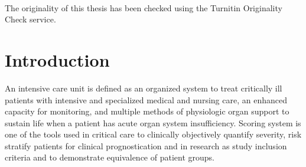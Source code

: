\documentclass[12pt,a4paper,english
]{tunithesis}
\begin{document}
~

\noindent The originality of this thesis has been checked using the Turnitin Originality Check service.




\setcounter{tocdepth}{3}              %
\tableofcontents                      %


\if@twoside
\cleardoublepage
\fi


\renewcommand{\chaptername}{} %


\chapter{Introduction}
\label{ch:intro} 

\setcounter{page}{1} %
                     


An intensive care unit is defined as an organized system to treat critically ill patients with intensive and specialized medical and nursing care, an enhanced capacity for monitoring, and multiple methods of physiologic organ support to sustain life when a patient has acute organ system insufficiency. Scoring system is one of the tools used in critical care to clinically objectively quantify severity, risk stratify patients for clinical prognostication and in research as study inclusion criteria and to demonstrate equivalence of patient groups. 
\end{document}
